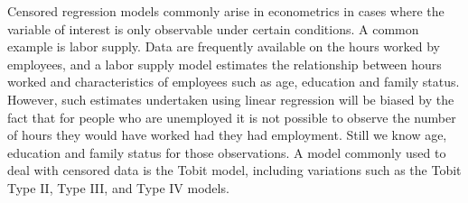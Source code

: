 Censored regression models commonly arise in econometrics in cases where the variable of interest is only observable under certain conditions. A common example is labor supply. Data are frequently available on the hours worked by employees, and a labor supply model estimates the relationship between hours worked and characteristics of employees such as age, education and family status. However, such estimates undertaken using linear regression will be biased by the fact that for people who are unemployed it is not possible to observe the number of hours they would have worked had they had employment. Still we know age, education and family status for those observations.
A model commonly used to deal with censored data is the Tobit model, including variations such as the Tobit Type II, Type III, and Type IV models.
